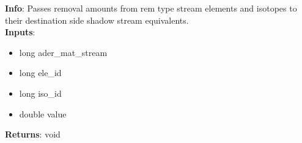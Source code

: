 \textbf{Info}: Passes removal amounts from rem type stream elements and isotopes
to their destination side shadow stream equivalents.\\

\noindent \textbf{Inputs}:
\begin{itemize}
\item{long ader\_mat\_stream}
\item{long ele\_id}
\item{long iso\_id}
\item{double value}
\end{itemize}

\noindent \textbf{Returns}: void
